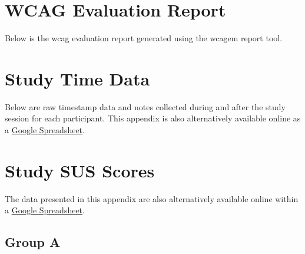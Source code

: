 \inputminted[breaklines=true,fontsize=\footnotesize]{text}{./assets/Xor.tst}

\chapter{WCAG Evaluation Report}
\label{appendix:wcag-report}

Below is the \gls{wcag} evaluation report generated using the \gls{wcagem} report tool.



\chapter{Study Time Data}
\label{appendix:study-time-notes}

Below are raw timestamp data and notes collected during and after the study session for each participant.
This appendix is also alternatively available online as a \href{https://docs.google.com/spreadsheets/d/1CGNs1pCKvGJ4QuRDCExNc_3SZ4pgX3UlTXSKJU8hpa8}{Google Spreadsheet}.



\chapter{Study SUS Scores}
\label{appendix:study-sus}

The data presented in this appendix are also alternatively available online within a \href{https://docs.google.com/spreadsheets/d/1CGNs1pCKvGJ4QuRDCExNc_3SZ4pgX3UlTXSKJU8hpa8}{Google Spreadsheet}.

\section*{Group A}

